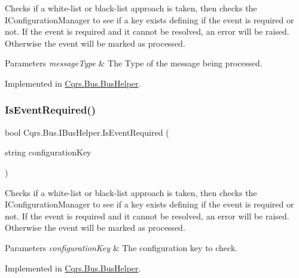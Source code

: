 Checks if a white-\/list or black-\/list approach is taken, then checks the I\+Configuration\+Manager to see if a key exists defining if the event is required or not. If the event is required and it cannot be resolved, an error will be raised. Otherwise the event will be marked as processed. 


\begin{DoxyParams}{Parameters}
{\em message\+Type} & The Type of the message being processed.\\
\hline
\end{DoxyParams}


Implemented in \hyperlink{classCqrs_1_1Bus_1_1BusHelper_a28c675e976adbf348637ec6ff6410c1a_a28c675e976adbf348637ec6ff6410c1a}{Cqrs.\+Bus.\+Bus\+Helper}.

\mbox{\label{interfaceCqrs_1_1Bus_1_1IBusHelper_af73d0d2aa8e98566acb4b2fb13a3e986_af73d0d2aa8e98566acb4b2fb13a3e986}} 
\subsubsection{\texorpdfstring{Is\+Event\+Required()}{IsEventRequired()}\hspace{0.1cm}{\footnotesize\ttfamily [2/2]}}
{\footnotesize\ttfamily bool Cqrs.\+Bus.\+I\+Bus\+Helper.\+Is\+Event\+Required (\begin{DoxyParamCaption}\item[{string}]{configuration\+Key }\end{DoxyParamCaption})}



Checks if a white-\/list or black-\/list approach is taken, then checks the I\+Configuration\+Manager to see if a key exists defining if the event is required or not. If the event is required and it cannot be resolved, an error will be raised. Otherwise the event will be marked as processed. 


\begin{DoxyParams}{Parameters}
{\em configuration\+Key} & The configuration key to check.\\
\hline
\end{DoxyParams}


Implemented in \hyperlink{classCqrs_1_1Bus_1_1BusHelper_a60a9603d5c6b7f29ee42491475714895_a60a9603d5c6b7f29ee42491475714895}{Cqrs.\+Bus.\+Bus\+Helper}.

